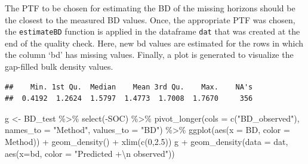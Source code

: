 \documentclass[
  10pt,
  b5paper,
  oneside]{book}
\newenvironment{Shaded}{\begin{snugshade}}{\end{snugshade}}
\newcommand{\AttributeTok}[1]{\textcolor[rgb]{0.77,0.63,0.00}{#1}}
\newcommand{\CommentTok}[1]{\textcolor[rgb]{0.56,0.35,0.01}{\textit{#1}}}
\newcommand{\DecValTok}[1]{\textcolor[rgb]{0.00,0.00,0.81}{#1}}
\newcommand{\DocumentationTok}[1]{\textcolor[rgb]{0.56,0.35,0.01}{\textbf{\textit{#1}}}}
\newcommand{\FloatTok}[1]{\textcolor[rgb]{0.00,0.00,0.81}{#1}}
\newcommand{\FunctionTok}[1]{\textcolor[rgb]{0.00,0.00,0.00}{#1}}
\newcommand{\NormalTok}[1]{#1}
\newcommand{\OtherTok}[1]{\textcolor[rgb]{0.56,0.35,0.01}{#1}}
\newcommand{\SpecialCharTok}[1]{\textcolor[rgb]{0.00,0.00,0.00}{#1}}
\newcommand{\StringTok}[1]{\textcolor[rgb]{0.31,0.60,0.02}{#1}}
\begin{document}
The PTF to be chosen for estimating the BD of the missing horizons should be the closest to the measured BD values. Once, the appropriate PTF was chosen, the \texttt{estimateBD} function is applied in the dataframe \texttt{dat} that was created at the end of the quality check. Here, new bd values are estimated for the rows in which the column `bd' has missing values. Finally, a plot is generated to visualize the gap-filled bulk density values.

\begin{Shaded}
\end{Shaded}

\begin{verbatim}
##    Min. 1st Qu.  Median    Mean 3rd Qu.    Max.    NA's 
##  0.4192  1.2624  1.5797  1.4773  1.7008  1.7670     356
\end{verbatim}

\begin{Shaded}
\begin{Highlighting}[]
\NormalTok{g }\OtherTok{\textless{}{-}}\NormalTok{ BD\_test }\SpecialCharTok{\%\textgreater{}\%} 
  \FunctionTok{select}\NormalTok{(}\SpecialCharTok{{-}}\NormalTok{SOC) }\SpecialCharTok{\%\textgreater{}\%} 
  \FunctionTok{pivot\_longer}\NormalTok{(}\AttributeTok{cols =} \FunctionTok{c}\NormalTok{(}\StringTok{"BD\_observed"}\NormalTok{), }
               \AttributeTok{names\_to =} \StringTok{"Method"}\NormalTok{, }\AttributeTok{values\_to =} \StringTok{"BD"}\NormalTok{) }\SpecialCharTok{\%\textgreater{}\%} 
  \FunctionTok{ggplot}\NormalTok{(}\FunctionTok{aes}\NormalTok{(}\AttributeTok{x =}\NormalTok{ BD, }\AttributeTok{color =}\NormalTok{ Method)) }\SpecialCharTok{+} 
  \FunctionTok{geom\_density}\NormalTok{() }\SpecialCharTok{+}
  \FunctionTok{xlim}\NormalTok{(}\FunctionTok{c}\NormalTok{(}\DecValTok{0}\NormalTok{,}\FloatTok{2.5}\NormalTok{))}
\NormalTok{g }\SpecialCharTok{+} \FunctionTok{geom\_density}\NormalTok{(}\AttributeTok{data =}\NormalTok{ dat, }\FunctionTok{aes}\NormalTok{(}\AttributeTok{x=}\NormalTok{bd, }\AttributeTok{color =} \StringTok{"Predicted +}\SpecialCharTok{\textbackslash{}n}\StringTok{ observed"}\NormalTok{))}
\end{Highlighting}
\end{Shaded}
\end{document}
